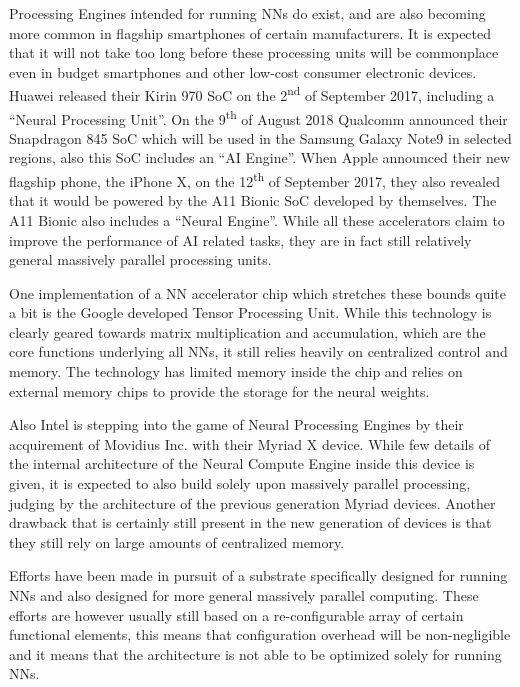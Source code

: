 Processing Engines intended for running \acp{NN} do exist, and are also becoming more common in flagship smartphones of certain manufacturers. It is expected that it will not take too long before these processing units will be commonplace even in budget smartphones and other low-cost consumer electronic devices. Huawei released their Kirin 970 \ac{SoC} on the 2\textsuperscript{nd} of September 2017\cite{huawei}, including a ``Neural Processing Unit''. On the 9\textsuperscript{th} of August 2018 Qualcomm announced their Snapdragon 845 \ac{SoC} which will be used in the Samsung Galaxy Note9 in selected regions\cite{qualcomm}, also this \ac{SoC} includes an ``AI Engine''. When Apple announced their new flagship phone, the iPhone X, on the 12\textsuperscript{th} of September 2017, they also revealed that it would be powered by the A11 Bionic \ac{SoC} developed by themselves\cite{apple}. The A11 Bionic also includes a ``Neural Engine''. While all these accelerators claim to improve the performance of \ac{AI} related tasks, they are in fact still relatively general massively parallel processing units\cite{techtarget}.

One implementation of a \ac{NN} accelerator chip which stretches these bounds quite a bit is the Google developed Tensor Processing Unit\cite{8192463,techtarget}. While this technology is clearly geared towards matrix multiplication and accumulation, which are the core functions underlying all \acp{NN}, it still relies heavily on centralized control and memory. The technology has limited memory inside the chip and relies on external memory chips to provide the storage for the neural weights.

Also Intel is stepping into the game of Neural Processing Engines by their acquirement of Movidius Inc. with their Myriad X device\cite{movidius2}. While few details of the internal architecture of the Neural Compute Engine inside this device is given, it is expected to also build solely upon massively parallel processing, judging by the architecture of the previous generation Myriad devices\cite{movidius1}. Another drawback that is certainly still present in the new generation of devices is that they still rely on large amounts of centralized memory.

Efforts have been made in pursuit of a substrate specifically designed for running \acp{NN}\cite{1693534} and also designed for more general massively parallel computing\cite{7818353}. These efforts are however usually still based on a re-configurable array of certain functional elements, this means that configuration overhead will be non-negligible and it means that the architecture is not able to be optimized solely for running \acp{NN}.

